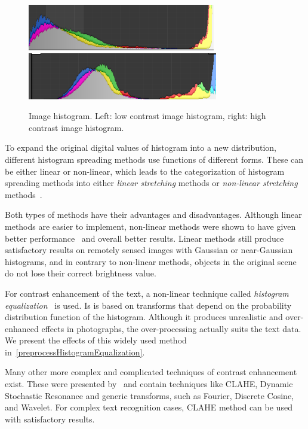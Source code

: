 \begin{figure}[t]
\centering
\includegraphics[width=0.4\linewidth]{img/preprocessing//histogram_low.png}
\qquad
\includegraphics[width=0.4\linewidth]{img/preprocessing/histogram_high.png}
\caption{Image histogram. Left: low contrast image histogram, right: high contrast image histogram.}
\label{fig:preprocessContrastComparison}
\end{figure}

To expand the original digital values of histogram into a new distribution, different histogram spreading methods use functions of different forms. These can be either linear or non-linear, which leads to the categorization of histogram spreading methods into either \emph{linear stretching} methods or \emph{non-linear stretching} methods~\citep{linearNonStretch}.

Both types of methods have their advantages and disadvantages. Although linear methods are easier to implement, non-linear methods were shown to have given better performance~\citep{chandpa1comparative} and overall better results. Linear methods still produce satisfactory results on remotely sensed images with Gaussian or near-Gaussian histograms, and in contrary to non-linear methods, objects in the original scene do not lose their correct brightness value.

For contrast enhancement of the text, a non-linear technique called \emph{histogram equalization}~\citep{histogramEQ} is used. Is is based on transforms that depend on the probability distribution function of the histogram. Although it produces unrealistic and over-enhanced effects in photographs, the over-processing actually suits the text data. We present the effects of this widely used method in~\cref{preprocessHistogramEqualization}.

Many other more complex and complicated techniques of contrast enhancement exist. These were presented by~\citet{contrastOther} and contain techniques like CLAHE, Dynamic Stochastic Resonance and generic transforms, such as Fourier, Discrete Cosine, and Wavelet. For complex text recognition cases, CLAHE method can be used with satisfactory results.

